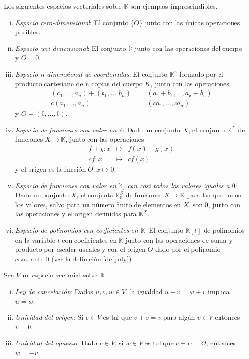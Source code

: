 \begin{ejem}\label{ejem0}
Los siguientes espacios vectoriales sobre $\mathbb{K}$ son ejemplos imprescindibles.
\begin{enumerate}[(i)]
\item \emph{Espacio cero-dimensional}: El conjunto $\{O\}$ junto con las \'unicas operaciones posibles.
\item \emph{Espacio uni-dimensional}: El conjunto $\mathbb{K}$ junto con las operaciones del cuerpo y $O=0$.
\item \emph{Espacio $n$-dimensional de coordenadas}: El conjunto $\mathbb{K}^n$ formado por el producto cartesiano de $n$ copias del cuerpo $K$, junto con las operaciones
\begin{eqnarray*}
(a_1,\ldots,a_n)+(b_1,\ldots,b_n) & = & (a_1+b_1,\ldots,a_n+b_n)\\
c(a_1,\ldots,a_n) & = & (ca_1,\ldots,ca_n)
\end{eqnarray*}
y $O=(0,\ldots,0)$.
\item \emph{Espacio de funciones con valor en $\mathbb{K}$}: Dado un conjunto $X$, el conjunto $\mathbb{K}^X$ de funciones $X\rightarrow \mathbb{K}$, junto con las operaciones
\begin{eqnarray*}
  f+g: x & \mapsto & f(x)+g(x)\\
  cf: x & \mapsto & cf(x)
\end{eqnarray*}
y el origen es la función $O: x\mapsto 0$.
\item \emph{Espacio de funciones con valor en $\mathbb{K}$, con casi todos los valores iguales a $0$}: Dado un conjunto $X$, el conjunto $\mathbb{K}^S_0$ de funciones $X\rightarrow \mathbb{K}$ para las que todos los valores, salvo para un n\'umero finito de elementos en $X$, son $0$, junto con las operaciones y el origen definidos para $\mathbb{K}^X$.
\item \emph{Espacio de polinomios con coeficientes en $\mathbb{K}$}: El conjunto $\mathbb{K}[t]$ de polinomios en la variable $t$ con coeficientes en $\mathbb{K}$ junto con las operaciones de suma y producto por escalar usuales y con el origen $O$ dado por el polinomio constante $0$ (ver la definición \ref{defpoly}).
\end{enumerate} 
\end{ejem}

\begin{pro}
Sea $V$ un espacio vectorial sobre $\mathbb{K}$
\begin{enumerate}[(i)]
  \item \emph{Ley de cancelaci\'on}: Dados $u,v,w\in V$, la igualdad $u+v=w+v$ implica $u=w$.
  \item \emph{Unicidad del origen}: Si $o\in V$ es tal que $v+o=v$ para algún $v\in V$ entonces $v=0$.
  \item \emph{Unicidad del opuesto}: Dado $v\in V$, si $w\in V$ es tal que $v+w=O$, entonces $w=-v$. 
\end{enumerate}
\end{pro}

